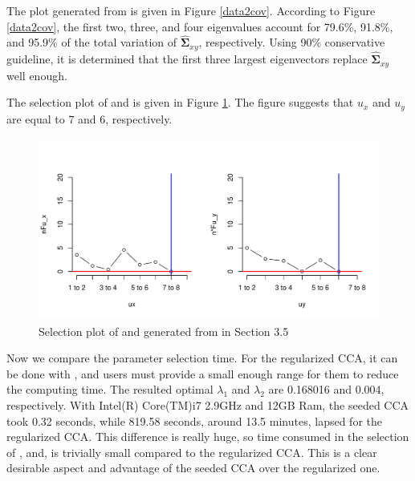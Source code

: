 The plot generated from  is given in Figure \ref{data2cov}.
According to Figure \ref{data2cov},
the first two, three, and four eigenvalues account for
79.6\%, 91.8\%, and 95.9\% of the total variation of
$\hat{\boldsymbol{\Sigma}}_{xy}$, respectively.
Using 90\% conservative guideline,  it is determined that
the first three largest eigenvectors replace $\hat{\boldsymbol{\Sigma}}_{xy}$ well enough.

The selection plot of  and  is given in Figure \ref{data2uxuy}.
The figure suggests that $u_x$ and $u_y$ are equal to 7 and 6, respectively.
%
\begin{figure}\begin{center}
\includegraphics[width=12cm,height=6cm]{data2uxuy3.pdf}
\vspace{-5mm}\caption{Selection plot of   and  generated from
 in Section 3.5}
\label{data2uxuy}
\end{center}\end{figure}
%

Now we compare the parameter selection time.
For the regularized CCA, it can be done with , and
users must provide a small enough range for them to reduce the computing time.
The resulted optimal $\lambda_1$ and $\lambda_2$ are 0.168016 and 0.004, respectively.
With Intel(R) Core(TM)i7 2.9GHz and 12GB Ram,
the seeded CCA took 0.32 seconds,
while 819.58 seconds, around 13.5 minutes, lapsed for the regularized CCA.
This difference is really huge,
so time consumed in the selection of ,  and, 
is trivially small compared to the regularized CCA.
This is a clear desirable aspect and advantage of the seeded CCA over the regularized one.

